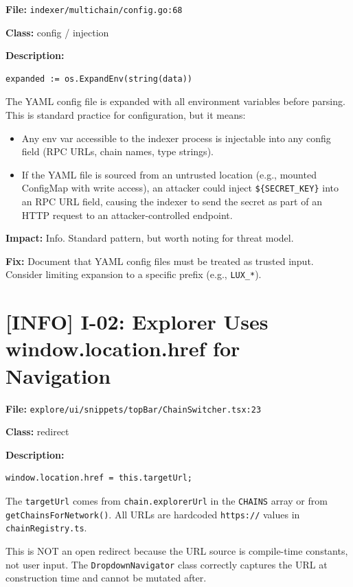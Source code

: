 \documentclass{article}
\begin{document}
\textbf{File:} \texttt{indexer/multichain/config.go:68}

\textbf{Class:} config / injection

\textbf{Description:}
\begin{lstlisting}
expanded := os.ExpandEnv(string(data))
\end{lstlisting}

The YAML config file is expanded with all environment variables before
parsing. This is standard practice for configuration, but it means:
\begin{itemize}
  \item Any env var accessible to the indexer process is injectable into
        any config field (RPC URLs, chain names, type strings).
  \item If the YAML file is sourced from an untrusted location (e.g., mounted
        ConfigMap with write access), an attacker could inject
        \texttt{\$\{SECRET\_KEY\}} into an RPC URL field, causing the
        indexer to send the secret as part of an HTTP request to an
        attacker-controlled endpoint.
\end{itemize}

\textbf{Impact:} Info. Standard pattern, but worth noting for threat model.

\textbf{Fix:} Document that YAML config files must be treated as trusted input.
Consider limiting expansion to a specific prefix (e.g., \texttt{LUX\_*}).


\section{[INFO] I-02: Explorer Uses window.location.href for Navigation}

\textbf{File:} \texttt{explore/ui/snippets/topBar/ChainSwitcher.tsx:23}

\textbf{Class:} redirect

\textbf{Description:}
\begin{lstlisting}
window.location.href = this.targetUrl;
\end{lstlisting}

The \texttt{targetUrl} comes from \texttt{chain.explorerUrl} in the
\texttt{CHAINS} array or from \texttt{getChainsForNetwork()}. All URLs
are hardcoded \texttt{https://} values in \texttt{chainRegistry.ts}.

This is NOT an open redirect because the URL source is compile-time
constants, not user input. The \texttt{DropdownNavigator} class correctly
captures the URL at construction time and cannot be mutated after.
\end{document}
